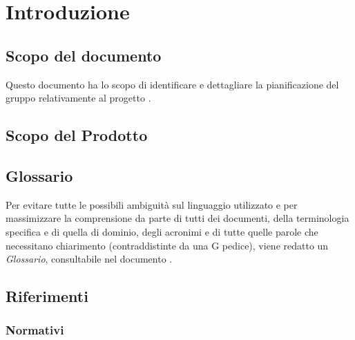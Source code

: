 \section{Introduzione}

\subsection{Scopo del documento}
Questo documento ha lo scopo di identificare e dettagliare la pianificazione del gruppo \GroupName{} relativamente al progetto \ProjectName{}. 

\subsection{Scopo del Prodotto}
\ScopoDelProdotto

\subsection{Glossario}
Per evitare tutte le possibili ambiguità sul linguaggio utilizzato e per massimizzare la comprensione da parte di tutti dei documenti, della terminologia specifica e di quella di dominio, degli acronimi e di tutte quelle parole che necessitano chiarimento (contraddistinte da una G pedice), viene redatto un \textit{Glossario}, consultabile nel documento \Glossario.

\subsection{Riferimenti}
\subsubsection{Normativi}

